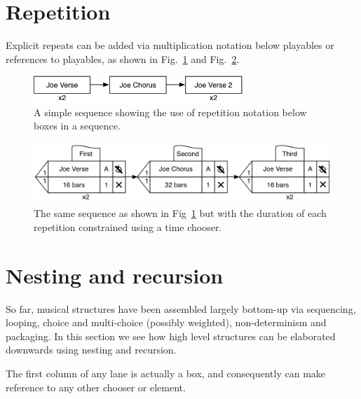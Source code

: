 \documentclass[runningheads,a4paper]{llncs}
\begin{document}
\section{Repetition}\label{repetition}

Explicit repeats can be added via multiplication notation below playables or references to playables, as shown in Fig.~\ref{fig:repetition} and Fig.~\ref{fig:repetition-durations}.

\begin{figure}
	\centering
	\includegraphics[height=1cm]{images/repetition.png}
	\caption{A simple sequence showing the use of repetition notation below boxes in a sequence.}\label{fig:repetition}
\end{figure}



\begin{figure}
	\centering
	\includegraphics[height=2.3cm]{images/repetition-durations.png}
	\caption{The same sequence as shown in Fig~\ref{fig:repetition} but with the duration of each repetition constrained using a time chooser.}\label{fig:repetition-durations}
\end{figure}



\section{Nesting and recursion}\label{nesting-and-recursion}

So far, musical structures have been assembled largely bottom-up via sequencing, looping, choice and multi-choice (possibly weighted), non-determinism and packaging. In this section we see how high level structures can be elaborated downwards using nesting and recursion.
 
The first column of any lane is actually a box, and consequently can make reference to any other chooser or element.
 
\end{document}
